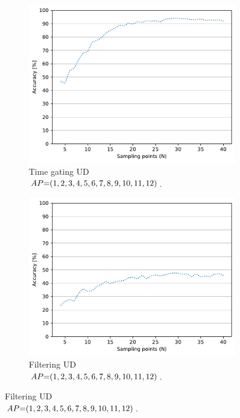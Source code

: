 \begin{figure}[!t]
    \begin{subfigure}{.49\textwidth}
        \centering
        \includegraphics[width=.99\linewidth]{Figures/RadarExperiments/Datasets/ThroughMaterials/Wood/samples-timegating-ud.pdf}
        \vspace{-5pt}
        \captionsetup{width=.99\linewidth}
        \caption{Time gating UD \\ $\splitatcommas{AP{=}(1, 2, 3, 4, 5, 6, 7, 8, 9, 10, 11, 12)}$.}
        \label{fig:radar-experiments:through-materials:wood-samples:timegating-ud}
    \end{subfigure}
    \begin{subfigure}{.49\textwidth}
        \centering
        \includegraphics[width=.99\linewidth]{Figures/RadarExperiments/Datasets/ThroughMaterials/Wood/samples-filtering-ud.pdf}  
        \vspace{-5pt}
        \captionsetup{width=.99\linewidth}
        \caption{Filtering UD \\ $\splitatcommas{AP{=}(1, 2, 3, 4, 5, 6, 7, 8, 9, 10, 11, 12)}$.}
        \label{fig:radar-experiments:through-materials:wood-samples:filtering-ud}
    \end{subfigure}
  

\end{figure}
